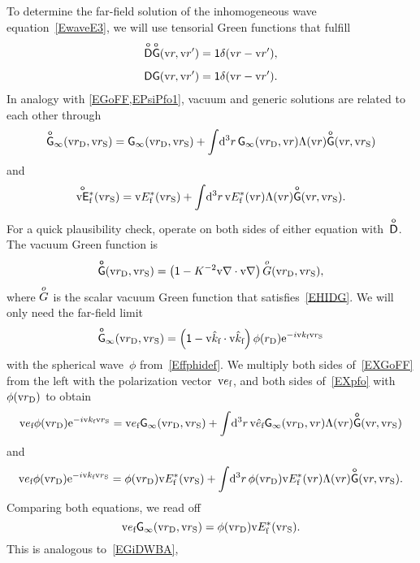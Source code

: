 To determine the far-field solution of the inhomogeneous wave equation~\cref{EwaveE3},
we will use tensorial Green functions that fulfill
%
\begin{align}
    \TDo\TGo(\r,\r') &= \ONE\delta(\r-\r'), \\[1.2ex]
    \TD  \TG  (\r,\r') &= \ONE\delta(\r-\r').
\end{align}
In analogy with \cref{EGoFF,EPsiPfo1},
vacuum and generic solutions are related to each other through
\begin{equation}\label{EXGoFF}
  \TGo_\infty(\rD,\rS)
  = \TG_\infty(\rD,\rS) + \int\!\d^3r\, \TG_\infty(\rD,\r)\Lambda(\r) \TGo(\r,\rS)
\end{equation}
and
\begin{equation}\label{EXpfo}
  \Efoc(\rS) = \Efc(\rS) + \int\!\d^3r\, \Efc(\r)\Lambda(\r) \TGo(\r,\rS).
\end{equation}
For a quick plausibility check, operate on both sides of either equation with~$\TDo$.
The vacuum Green function is
\begin{equation}\label{EXGoIE}
  \TGo(\rD,\rS) = \left( \ONE - K^{-2}\Nabla\cdot\Nabla \right) \Go(\rD,\rS),
\end{equation}
where $\Go$ is the scalar vacuum Green function that satisfies~\cref{EHIDG}.
We will only need the far-field limit
\begin{equation}\label{EXGoff}
  \TGo_\infty(\rD,\rS)
   = \left( \ONE - \v{\hat k}_\sf\cdot\v{\hat k}_\sf \right) \phi(r_\text{D})\e^{-i\k_\sf\rS}
\end{equation}
with the spherical wave~$\phi$ from~\cref{Effphidef}.
We multiply both sides of~\cref{EXGoFF} from the left with the polarization vector~$\v{e}_\sf$,
and both sides of~\cref{EXpfo} with~$\phi(\rD)$ to obtain
\begin{equation}\label{EXGoFF2}
  \v{e}_\sf\phi(\rD)\e^{-i\k_\sf\rS}
  = \v{e}_\sf\TG_\infty(\rD,\rS) + \int\!\d^3r\, \hef\TG_\infty(\rD,\r)\Lambda(\r) \TGo(\r,\rS)
\end{equation}
and
\begin{equation}\label{EXpfo2}
  \v{e}_\sf\phi(\rD)\e^{-i\k_\sf\rS}
  = \phi(\rD)\Efc(\rS) + \int\!\d^3r\, \phi(\rD)\Efc(\r)\Lambda(\r) \TGo(\r,\rS).
\end{equation}
Comparing both equations, we read off
\begin{equation}\label{EGpE}
  \v{e}_\sf\TG_\infty(\rD,\rS) = \phi(\rD)\Efc(\rS).
\end{equation}
This is analogous to~\cref{EGiDWBA},
